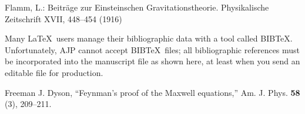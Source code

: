 \documentclass[prb,preprint]{revtex4-1}
\begin{document}
\begin{thebibliography}{99}

 Flamm, L.: Beitr\"{a}ge zur Einsteinschen
  Gravitationstheorie.  Physikalische Zeitschrift XVII, 448–454 (1916)
  
 Many \LaTeX\ users manage their bibliographic data with 
a tool called BIB\TeX.  Unfortunately, AJP cannot accept BIB\TeX\ files; all 
bibliographic references must be incorporated into the manuscript file
as shown here, at least when you send an editable file for production.

 Freeman J. Dyson, ``Feynman's proof of the Maxwell equations,''
Am. J. Phys. \textbf{58} (3), 209--211.  



\end{thebibliography}



\end{document}
